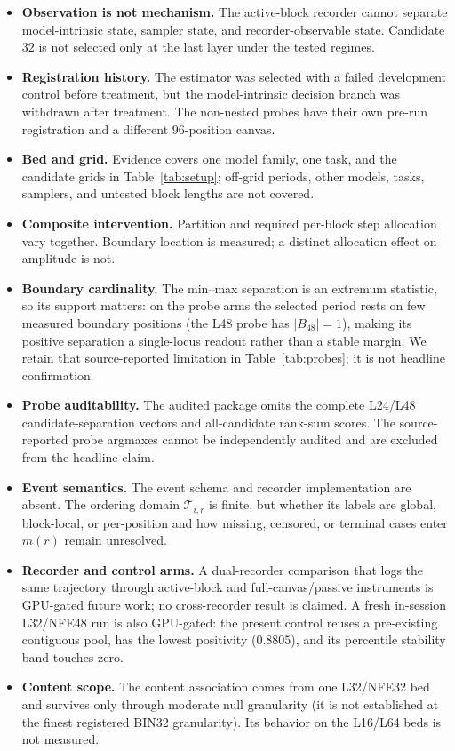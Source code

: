 \documentclass{article}
\begin{document}
\begin{itemize}
  \item \textbf{Observation is not mechanism.} The active-block recorder cannot
  separate model-intrinsic state, sampler state, and recorder-observable state.
  Candidate $32$ is not selected only at the last layer under the tested regimes.
  \item \textbf{Registration history.} The estimator was selected with a failed
  development control before treatment, but the model-intrinsic decision branch
  was withdrawn after treatment. The non-nested probes have their own pre-run
  registration and a different $96$-position canvas.
  \item \textbf{Bed and grid.} Evidence covers one model family, one task, and the
  candidate grids in Table~\ref{tab:setup}; off-grid periods, other models, tasks,
  samplers, and untested block lengths are not covered.
  \item \textbf{Composite intervention.} Partition and required per-block step
  allocation vary together. Boundary location is measured; a distinct allocation
  effect on amplitude is not.
  \item \textbf{Boundary cardinality.} The min--max separation is an extremum
  statistic, so its support matters: on the probe arms the selected period rests
  on few measured boundary positions (the L48 probe has $|B_{48}|{=}1$), making
  its positive separation a single-locus readout rather than a stable margin. We
  retain that source-reported limitation in Table~\ref{tab:probes}; it is not
  headline confirmation.
  \item \textbf{Probe auditability.} The audited package omits the complete
  L24/L48 candidate-separation vectors and all-candidate rank-sum scores. The
  source-reported probe argmaxes cannot be independently audited and are excluded
  from the headline claim.
  \item \textbf{Event semantics.} The event schema and recorder implementation
  are absent. The ordering domain $\mathcal T_{i,r}$ is finite, but whether its
  labels are global, block-local, or per-position and how missing, censored, or
  terminal cases enter $m(r)$ remain unresolved.
  \item \textbf{Recorder and control arms.} A dual-recorder comparison that logs
  the same trajectory through active-block and full-canvas/passive instruments is
  GPU-gated future work; no cross-recorder result is claimed. A fresh in-session
  L32/NFE48 run is also GPU-gated: the present control reuses a pre-existing
  contiguous pool, has the lowest positivity ($0.8805$), and its percentile
  stability band touches zero.
  \item \textbf{Content scope.} The content association comes from one L32/NFE32
  bed and survives only through moderate null granularity (it is not established
  at the finest registered BIN32 granularity). Its behavior on the L16/L64 beds is
  not measured.
\end{itemize}
\end{document}
